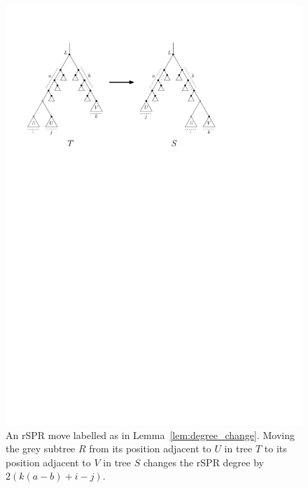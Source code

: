 \documentclass[11pt,onecolumn,conference]{IEEEtran}
\let\MYoriglatexcaption\caption
\renewcommand{\caption}[2][\relax]{\MYoriglatexcaption[#2]{#2}}
\begin{document}
\begin{figure}
	\includegraphics[width=\textwidth]{figs/spr-degree-change}
	\caption{An rSPR move labelled as in Lemma~\ref{lem:degree_change}.
Moving the grey subtree $R$ from its position adjacent to $U$ in tree $T$ to its position adjacent to $V$ in tree $S$ changes the rSPR degree by $2\left(k(a-b) + i - j\right)$.}
	\label{fig:spr-degree-change}
\end{figure}
\end{document}
